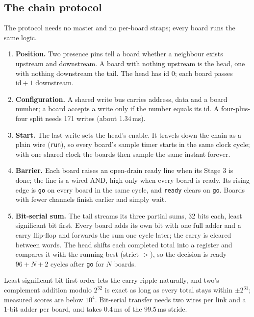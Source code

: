 \documentclass[11pt,a4paper]{article}
\begin{document}
\subsection{The chain protocol}\label{sec:chain}
The protocol needs no master and no per-board straps; every board runs the same logic.
\begin{enumerate}
\item \textbf{Position.} Two presence pins tell a board whether a neighbour exists upstream and downstream. A
board with nothing upstream is the head, one with nothing downstream the tail. The head has id 0; each board
passes $\text{id}+1$ downstream.
\item \textbf{Configuration.} A shared write bus carries address, data and a board number; a board accepts a
write only if the number equals its id. A four-plus-four split needs 171 writes (about 1.34\,ms).
\item \textbf{Start.} The last write sets the head's enable. It travels down the chain as a plain wire
(\texttt{run}), so every board's sample timer starts in the same clock cycle; with one shared clock the boards
then sample the same instant forever.
\item \textbf{Barrier.} Each board raises an open-drain ready line when its Stage 3 is done; the line is a
wired AND, high only when every board is ready. Its rising edge is \texttt{go} on every board in the same cycle,
and \texttt{ready} clears on \texttt{go}. Boards with fewer channels finish earlier and simply wait.
\item \textbf{Bit-serial sum.} The tail streams its three partial sums, 32 bits each, least significant bit
first. Every board adds its own bit with one full adder and a carry flip-flop and forwards the sum one cycle
later; the carry is cleared between words. The head shifts each completed total into a register and compares it
with the running best (strict $>$), so the decision is ready $96+N+2$ cycles after \texttt{go} for $N$ boards.
\end{enumerate}
Least-significant-bit-first order lets the carry ripple naturally, and two's-complement addition modulo $2^{32}$
is exact as long as every total stays within $\pm2^{31}$; measured scores are below $10^4$. Bit-serial transfer
needs two wires per link and a 1-bit adder per board, and takes 0.4\,ms of the 99.5\,ms stride.
\end{document}
